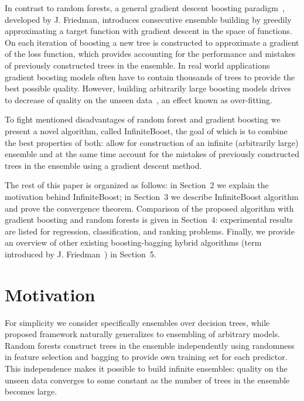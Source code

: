 In contrast to random forests, a general gradient descent boosting paradigm~\cite{key-gb,key-sgb}, developed by J. Friedman, 
introduces consecutive ensemble building by greedily approximating a target function with gradient descent in the space of functions. 
On each iteration of boosting a new tree is constructed to approximate a gradient of the loss function, %
which provides accounting for the performance and mistakes of previously constructed trees in the ensemble.
In real world applications gradient boosting models often have to contain thousands of trees to provide the best possible quality.
However, building arbitrarily large boosting models drives to decrease of quality on the unseen data~\cite{key-brownboost, key-dart}, an effect known as over-fitting.

To fight mentioned disadvantages of random forest and gradient boosting we present a novel algorithm, called InfiniteBoost, the goal of which is to combine the best properties of both: allow for construction of an infinite (arbitrarily large) ensemble and at the same time account for the mistakes of previously constructed trees in the ensemble using a gradient descent method.

The rest of this paper is organized as follows: in Section~2 we explain the motivation behind InfiniteBoost; in Section~3 we describe InfiniteBoost algorithm and prove the convergence theorem.
Comparison of the proposed algorithm with gradient boosting and random forests is given in Section~4: experimental results are listed for regression, classification, and ranking problems. 
Finally, we provide an overview of other existing boosting-bagging hybrid algorithms (term introduced by J. Friedman~\cite{key-sgb}) in Section~5.


\section{Motivation}

For simplicity we consider specifically ensembles over decision trees, while proposed framework naturally generalizes to ensembling of arbitrary models.
Random forests construct trees in the ensemble independently using randomness in feature selection and bagging to provide own training set for each predictor.
This independence makes it possible to build infinite ensembles: quality on the unseen data converges to some constant as the number of trees in the ensemble becomes large.

